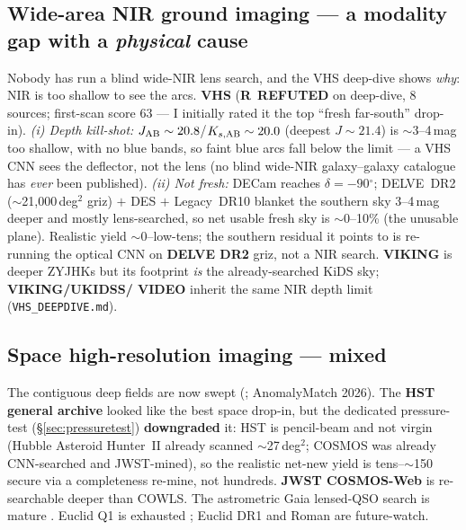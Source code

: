 \documentclass[11pt,letterpaper]{article}
\providecommand{\degree}{\ensuremath{^\circ}}
\newcommand{\rgR}{\textcolor{red!72!black}{\textbf{R}}}
\newcommand{\survey}[1]{\textbf{#1}}
\begin{document}
\subsection{Wide-area NIR ground imaging --- a modality gap with a \emph{physical} cause}
Nobody has run a blind wide-NIR lens search, and the VHS deep-dive shows \emph{why}: NIR is too
shallow to see the arcs. \survey{VHS} (\rgR\ \textbf{REFUTED} on deep-dive, 8 sources; first-scan
score 63 --- I initially rated it the top ``fresh far-south'' drop-in). \emph{(i) Depth kill-shot:}
$J_{\rm AB}\sim20.8$/$K_{s,\rm AB}\sim20.0$ (deepest $J\sim21.4$) is $\sim$3--4\,mag too shallow,
with no blue bands, so faint blue arcs fall below the limit --- a VHS CNN sees the deflector, not
the lens (no blind wide-NIR galaxy--galaxy catalogue has \emph{ever} been published). \emph{(ii) Not
fresh:} DECam reaches $\delta=-90\degree$; DELVE~DR2 ($\sim$21{,}000\,deg$^2$ griz) $+$ DES $+$
Legacy~DR10 blanket the southern sky 3--4\,mag deeper and mostly lens-searched, so net usable fresh
sky is $\sim$0--10\% (the unusable plane). Realistic yield $\sim$0--low-tens; the southern residual
it points to is re-running the optical CNN on \survey{DELVE DR2} griz, not a NIR search. \survey{VIKING}
is deeper ZYJHKs but its footprint \emph{is} the already-searched KiDS sky; \survey{VIKING/UKIDSS/
VIDEO} inherit the same NIR depth limit (\texttt{VHS\_DEEPDIVE.md}).

\subsection{Space high-resolution imaging --- mixed}
The contiguous deep fields are now swept (\citealt{nersesian2025cowls,nagam2025}; AnomalyMatch
2026). The \survey{HST general archive} looked like the best space drop-in, but the dedicated
pressure-test (\S\ref{sec:pressuretest}) \textbf{downgraded} it: HST is pencil-beam and not virgin
(Hubble Asteroid Hunter~II \citep{garvin2022} already scanned $\sim$27\,deg$^2$; COSMOS was already
CNN-searched \citep{pourrahmani2018,faure2008} and JWST-mined), so the realistic net-new yield is
tens--$\sim$150 secure via a completeness re-mine, not hundreds. \survey{JWST COSMOS-Web} is
re-searchable deeper than COWLS. The astrometric Gaia lensed-QSO search is mature
\citep{lemon2019,kronemartins2025gral9}. Euclid Q1 is exhausted \citep{euclidQ1A,euclidF}; Euclid
DR1 and Roman are future-watch.
\end{document}
